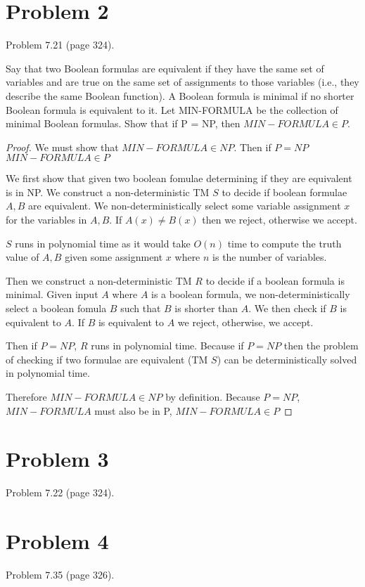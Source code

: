 \documentclass[11pt]{article}
\begin{document}
\newpage
\section*{Problem 2}

Problem 7.21 (page 324).

Say that two Boolean formulas are equivalent if they have the same set of variables
and are true on the same set of assignments to those variables (i.e., they describe
the same Boolean function). A Boolean formula is minimal if no shorter Boolean
formula is equivalent to it. Let MIN-FORMULA be the collection of minimal
Boolean formulas. Show that if P = NP, then $MIN-FORMULA \in P$.


\begin{proof}


We must show that $MIN-FORMULA \in NP$. Then if $P = NP$ $MIN-FORMULA \in P$


We first show that given two boolean fomulae determining if they are equivalent is in NP. We construct a non-deterministic TM $S$ to decide if boolean formulae $A, B$ are equivalent. We non-deterministically select some variable assignment $x$ for the variables in $A, B$. If $A(x) \neq B(x)$ then we reject, otherwise we accept. 

$S$ runs in polynomial time as it would take $O(n)$ time to compute the truth value of $A, B$ given some assignment $x$ where $n$ is the number of variables. 



Then we construct a non-deterministic TM $R$ to decide if a boolean formula is minimal. Given input $A$ where $A$ is a boolean formula, we non-deterministically select a boolean fomula $B$ such that $B$ is shorter than $A$. We then check if $B$ is equivalent to $A$. If $B$ is equivalent to $A$ we reject, otherwise, we accept. 

Then if $P = NP$, $R$ runs in polynomial time. Because if $P = NP$ then the problem of checking if two formulae are equivalent (TM $S$) can be deterministically solved in polynomial time. 

Therefore $MIN-FORMULA \in NP$ by definition. Because $P = NP$, $MIN-FORMULA$ must also be in P, $MIN-FORMULA \in P$

\end{proof}


\newpage
\section*{Problem 3}

Problem 7.22 (page 324).
\newline


\newpage
\section*{Problem 4}

Problem 7.35 (page 326).
\end{document}
